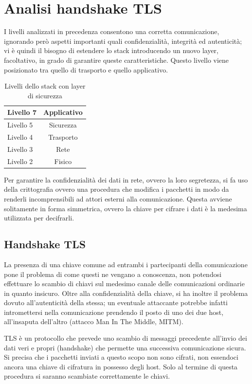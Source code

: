 \chapter{Analisi handshake TLS}
I livelli analizzati in precedenza consentono una corretta comunicazione, ignorando però aspetti importanti quali confidenzialità, integrità ed autenticità; vi è quindi il bisogno di estendere lo stack introducendo un nuovo layer, facoltativo, in grado di garantire queste caratteristiche.
Questo livello viene posizionato tra quello di trasporto e quello applicativo. 

\begin{table}[h]
	\centering
	\begin{tabular}{| l | c |}
		\hline
		Livello 7 & Applicativo
		\\
		\hline
		\rowcolor{yellow!10}Livello 5 & Sicurezza
		\\
		\hline
		Livello 4 & Trasporto
		\\
		\hline
		Livello 3 & Rete
		\\
		\hline
		Livello 2 & Fisico
		\\
		\hline
		
	\end{tabular}
	\caption{Livelli dello stack con layer di sicurezza}
	\label{tab:stackTLS}
\end{table}

Per garantire la confidenzialità dei dati in rete, ovvero la loro segretezza, si fa uso della crittografia ovvero una procedura che modifica i pacchetti in modo da renderli incomprensibili ad attori esterni alla comunicazione.
Questa avviene solitamente in forma simmetrica, ovvero la chiave per cifrare i dati è la medesima utilizzata per decifrarli.

\section{Handshake TLS}
La presenza di una chiave comune ad entrambi i partecipanti della comunicazione pone il problema di come questi ne vengano a conoscenza, non potendosi effettuare lo scambio di chiavi sul medesimo canale delle comunicazioni ordinarie in quanto insicuro.
Oltre alla confidenzialità della chiave, si ha inoltre il problema dovuto all'autenticità della stessa; un eventuale attaccante potrebbe infatti intromettersi nella comunicazione prendendo il posto di uno dei due host, all'insaputa dell'altro (attacco Man In The Middle, MITM).

TLS è un protocollo che prevede uno scambio di messaggi precedente all'invio dei dati veri e propri (handshake) che permette una successiva comunicazione sicura. Si precisa che i pacchetti inviati a questo scopo non sono cifrati, non essendoci ancora una chiave di cifratura in possesso degli host. Solo al termine di questa procedura si saranno scambiate correttamente le chiavi.

